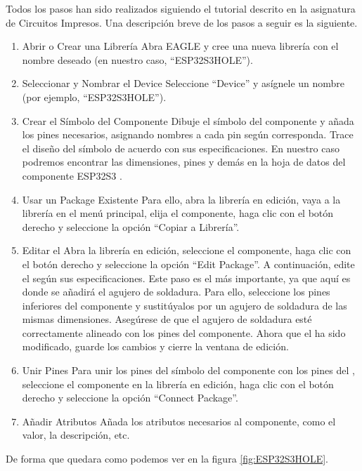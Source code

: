 Todos los pasos han sido realizados siguiendo el tutorial descrito en la asignatura de Circuitos Impresos. Una descripción breve de los pasos a seguir es la siguiente.

\begin{enumerate}
    \item Abrir o Crear una Librería
    Abra EAGLE y cree una nueva librería con el nombre deseado (en nuestro caso, ``ESP32S3HOLE'').
    \item Seleccionar y Nombrar el Device
    Seleccione ``Device'' y asígnele un nombre (por ejemplo, ``ESP32S3HOLE'').
    \item Crear el Símbolo del Componente
    Dibuje el símbolo del componente y añada los pines necesarios, asignando nombres a cada pin según corresponda. Trace el diseño del símbolo de acuerdo con sus especificaciones. En nuestro caso podremos encontrar las dimensiones, pines y demás en la hoja de datos del componente ESP32S3 \cite{ESP32S3Datasheet}.
    \item Usar un Package Existente
    Para ello, abra la librería en edición, vaya a la librería en el menú principal, elija el componente, haga clic con el botón derecho y seleccione la opción ``Copiar a Librería''.
    \item Editar el 
    Abra la librería en edición, seleccione el componente, haga clic con el botón derecho y seleccione la opción ``Edit Package''. A continuación, edite el  según sus especificaciones.
    Este paso es el más importante, ya que aquí es donde se añadirá el agujero de soldadura. Para ello, seleccione los pines inferiores del componente y sustitúyalos por un agujero de soldadura de las mismas dimensiones. Asegúrese de que el agujero de soldadura esté correctamente alineado con los pines del componente.
    Ahora que el  ha sido modificado, guarde los cambios y cierre la ventana de edición.
    \item Unir Pines
    Para unir los pines del símbolo del componente con los pines del , seleccione el componente en la librería en edición, haga clic con el botón derecho y seleccione la opción ``Connect Package''.
    \item Añadir Atributos
    Añada los atributos necesarios al componente, como el valor, la descripción, etc.
\end{enumerate}

De forma que quedara como podemos ver en la figura \ref{fig:ESP32S3HOLE}.

